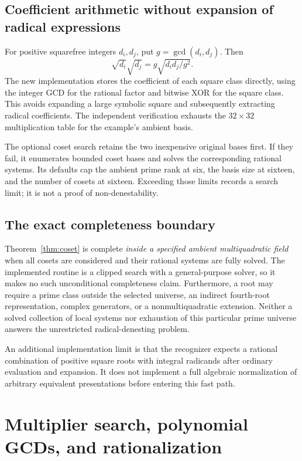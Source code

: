 \documentclass[11pt,letterpaper]{article}
\numberwithin{equation}{section}
\theoremstyle{definition}\newtheorem{definition}[theorem]{Definition}
\theoremstyle{remark}\newtheorem{remark}[theorem]{Remark}
\begin{document}
\subsection{Coefficient arithmetic without expansion of radical expressions}
For positive squarefree integers $d_i,d_j$, put $g=\gcd(d_i,d_j)$. Then
\begin{equation}
\sqrt{d_i}\sqrt{d_j}=g\sqrt{d_i d_j/g^2}.
\label{eq:surdproduct}
\end{equation}
The new implementation stores the coefficient of each square class directly, using the integer GCD for the rational factor and bitwise XOR for the square class. This avoids expanding a large symbolic square and subsequently extracting radical coefficients. The independent verification exhausts the $32\times32$ multiplication table for the example's ambient basis.

The optional coset search retains the two inexpensive original bases first. If they fail, it enumerates bounded coset bases and solves the corresponding rational systems. Its defaults cap the ambient prime rank at six, the basis size at sixteen, and the number of cosets at sixteen. Exceeding those limits records a search limit; it is not a proof of non-denestability.

\subsection{The exact completeness boundary}
Theorem~\ref{thm:coset} is complete \emph{inside a specified ambient multiquadratic field} when all cosets are considered and their rational systems are fully solved. The implemented routine is a clipped search with a general-purpose solver, so it makes no such unconditional completeness claim. Furthermore, a root may require a prime class outside the selected universe, an indirect fourth-root representation, complex generators, or a nonmultiquadratic extension. Neither a solved collection of local systems nor exhaustion of this particular prime universe answers the unrestricted radical-denesting problem.

An additional implementation limit is that the recognizer expects a rational combination of positive square roots with integral radicands after ordinary evaluation and expansion. It does not implement a full algebraic normalization of arbitrary equivalent presentations before entering this fast path.

\section{Multiplier search, polynomial GCDs, and rationalization}
\end{document}

